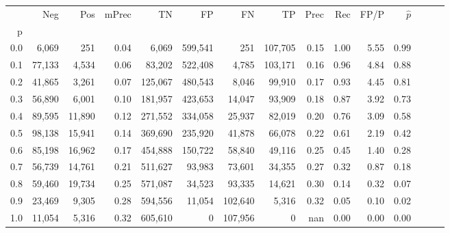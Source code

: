\begin{tabular}{rrrrrrrrrrrrrrr}
\toprule
{} &     Neg &     Pos & mPrec &       TN &       FP &       FN &       TP &  Prec &   Rec &  FP/P & $\hat{p}$ \\
p   &         &         &       &          &          &          &          &       &       &       &           \\
\midrule
0.0 &   6,069 &     251 &  0.04 &    6,069 &  599,541 &      251 &  107,705 &  0.15 &  1.00 &  5.55 &      0.99 \\
0.1 &  77,133 &   4,534 &  0.06 &   83,202 &  522,408 &    4,785 &  103,171 &  0.16 &  0.96 &  4.84 &      0.88 \\
0.2 &  41,865 &   3,261 &  0.07 &  125,067 &  480,543 &    8,046 &   99,910 &  0.17 &  0.93 &  4.45 &      0.81 \\
0.3 &  56,890 &   6,001 &  0.10 &  181,957 &  423,653 &   14,047 &   93,909 &  0.18 &  0.87 &  3.92 &      0.73 \\
0.4 &  89,595 &  11,890 &  0.12 &  271,552 &  334,058 &   25,937 &   82,019 &  0.20 &  0.76 &  3.09 &      0.58 \\
0.5 &  98,138 &  15,941 &  0.14 &  369,690 &  235,920 &   41,878 &   66,078 &  0.22 &  0.61 &  2.19 &      0.42 \\
0.6 &  85,198 &  16,962 &  0.17 &  454,888 &  150,722 &   58,840 &   49,116 &  0.25 &  0.45 &  1.40 &      0.28 \\
0.7 &  56,739 &  14,761 &  0.21 &  511,627 &   93,983 &   73,601 &   34,355 &  0.27 &  0.32 &  0.87 &      0.18 \\
0.8 &  59,460 &  19,734 &  0.25 &  571,087 &   34,523 &   93,335 &   14,621 &  0.30 &  0.14 &  0.32 &      0.07 \\
0.9 &  23,469 &   9,305 &  0.28 &  594,556 &   11,054 &  102,640 &    5,316 &  0.32 &  0.05 &  0.10 &      0.02 \\
1.0 &  11,054 &   5,316 &  0.32 &  605,610 &        0 &  107,956 &        0 &   nan &  0.00 &  0.00 &      0.00 \\
\bottomrule
\end{tabular}
